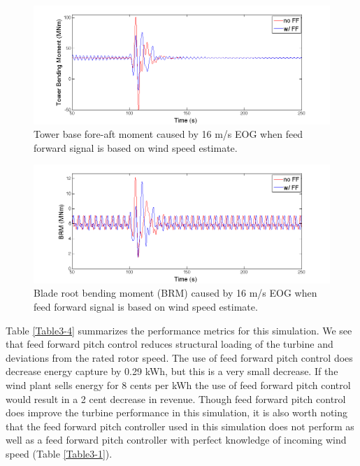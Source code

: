 \begin{figure}[htb]
	\centering
		\includegraphics[width = \linewidth]{Figures/ch3Figures/fig3-28.png}
		
	\caption{Tower base fore-aft moment caused by 16 m/s EOG when feed forward signal is based on wind speed estimate.}
	\label{fig3-28}
\end{figure}

\begin{figure}[htb]
	\centering
		\includegraphics[width = \linewidth]{Figures/ch3Figures/fig3-29.png}
		\caption{Blade root bending moment (BRM) caused by 16 m/s EOG when feed forward signal is based on wind speed estimate.}
	\label{fig3-29}
\end{figure}

Table \ref{Table3-4} summarizes the performance metrics for this simulation. We see that feed forward pitch control reduces structural loading of the turbine and deviations from the rated rotor speed. The use of feed forward pitch control does decrease energy capture by 0.29 kWh, but this is a very small decrease. If the wind plant sells energy for 8 cents per kWh the use of feed forward pitch control would result in a 2 cent decrease in revenue. Though feed forward pitch control does improve the turbine performance in this simulation, it is also worth noting that the feed forward pitch controller used in this simulation does not perform as well as a feed forward pitch controller with perfect knowledge of incoming wind speed (Table \ref{Table3-1}).

